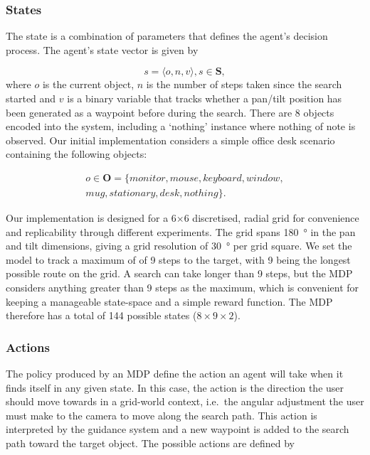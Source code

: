 \documentclass[a4paper, twoside]{article}
\begin{document}
\subsubsection{States}\label{sec:states}

\noindent The state is a combination of parameters that defines the agent's decision process. The agent's state vector is given by 

\begin{equation}
  s = \langle{}o, n, v\rangle, s\in{}\mathbf{S}, 
\end{equation}
where $o$ is the current object, $n$ is the number of steps taken since the search started and $v$ is a binary variable that tracks whether a pan/tilt position has been generated as a waypoint before during the search. There are 8 objects encoded into the system, including a `nothing' instance where nothing of note is observed. Our initial implementation considers a simple office desk scenario containing the following objects:

\begin{equation}
  \begin{aligned}
    o\in \mathbf{O} = \{monitor, mouse, keyboard, window,\\mug, stationary, desk, nothing\}.
  \end{aligned}
\end{equation}

Our implementation is designed for a 6$\times$6 discretised, radial grid for convenience and replicability through different experiments. The grid spans \SI{180}{\degree} in the pan and tilt dimensions, giving a grid resolution of \SI{30}{\degree} per grid square. We set the model to track a maximum of of 9 steps to the target, with 9 being the longest possible route on the grid. A search can take longer than 9 steps, but the MDP considers anything greater than 9 steps as the maximum, which is convenient for keeping a manageable state-space and a simple reward function. The MDP therefore has a total of 144 possible states ($8\times9\times2$).

\subsubsection{Actions}

The policy produced by an MDP define the action an agent will take when it finds itself in any given state. In this case, the action is the direction the user should move towards in a grid-world context, i.e.\ the angular adjustment the user must make to the camera to move along the search path. This action is interpreted by the guidance system and a new waypoint is added to the search path toward the target object. The possible actions are defined by
\end{document}
